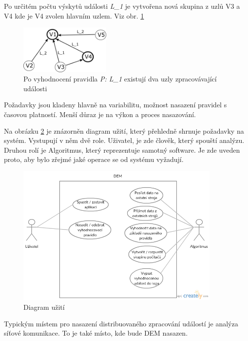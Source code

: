 \documentclass[
  digital, %
  table,   %
  nolof,     %
  nolot,     %
  twoside, %
  nocover,
  monochrome,
  12pt
]{fithesis3}
\begin{document}
Po určitém počtu výskytů události \textit{L\_1} je vytvořena nová skupina z uzlů V3 a V4 kde je V4 zvolen hlavním uzlem. Viz obr. \ref{fig:analysis_case_2}

\begin{figure}[H]
	\centering
    \includegraphics[width=0.4\textwidth, height=0.15\textheight]{images/analysis_case_2.png}
    \caption{Po vyhodnocení pravidla \textit{P: L\_1} existují dva uzly zpracovávající události}
    \label{fig:analysis_case_2}
\end{figure}

Požadavky jsou kladeny hlavně na variabilitu, možnost nasazení pravidel s časovou platností. Menší důraz je na výkon a proces nasazování.

Na obrázku \ref{fig:usecase} je znázorněn diagram užití, který přehledně shrnuje požadavky na systém. Vystupují v něm dvě role. Uživatel, je zde člověk, který spouští analýzu. Druhou rolí je Algoritmus, který reprezentuje samotný software. Je zde uveden proto, aby bylo zřejmé jaké operace se od systému vyžadují.

\begin{figure}[H]
	\centering
    \includegraphics[width=0.9\textwidth, height=0.45\textheight]{images/usecase.png}
    \caption{Diagram užití}
    \label{fig:usecase}
\end{figure}

Typickým místem pro nasazení distribuovaného zpracování událostí je analýza síťové komunikace. To je také místo, kde bude DEM nasazen.
\end{document}
